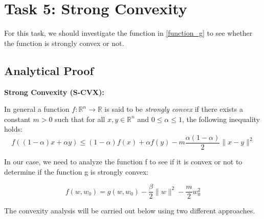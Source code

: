 \documentclass[a4paper,12pt]{report}
\begin{document}
\section{Task 5: Strong Convexity}
For this task, we should investigate the function in \eqref{function_g} to see whether the function is strongly convex or not.
\vspace{0.3cm}

\subsection{Analytical Proof}

\textbf{Strong Convexity (S-CVX):}

In general a function \( f : \mathbb{R}^n \to \mathbb{R} \) is said to be \textit{strongly convex} if there exists a constant \( m > 0 \) such that for all \( x, y \in \mathbb{R}^n \) and \( 0 \leq \alpha \leq 1 \), the following inequality holds:
\begin{equation}
f\left((1 - \alpha)x + \alpha y\right) \leq (1 - \alpha) f(x) + \alpha f(y) - m \frac{\alpha(1 - \alpha)}{2} \|x - y\|^2
\end{equation}

In our case, we need to analyze the function f to see if it is convex or not to determine if the function g is strongly convex:

\begin{equation}
f(w, w_0) = g(w, w_0) - \frac{\beta}{2} \| w \|^2 - \frac{m}{2} w_0^2
\end{equation}

The convexity analysis will be carried out below using two different approaches.
\end{document}
